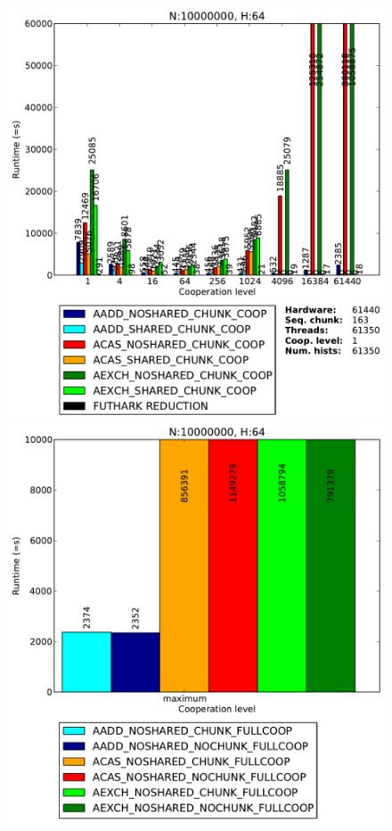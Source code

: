 \begin{figure}
\begin{minipage}{0.5\textwidth}
\end{minipage}
\begin{minipage}{0.5\textwidth}
\includegraphics[scale=0.35]{input/content/figures/experiment/hist-64}
\end{minipage}
\begin{minipage}{0.5\textwidth}
\includegraphics[scale=0.35]{input/content/figures/experiment/hist-64-full}

\end{minipage}
\end{figure}

